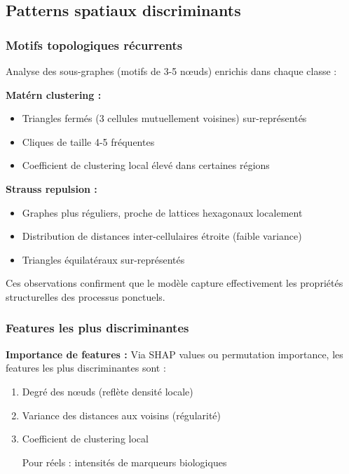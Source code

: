 \subsection{Patterns spatiaux discriminants}

\subsubsection{Motifs topologiques récurrents}

Analyse des sous-graphes (motifs de 3-5 nœuds) enrichis dans chaque classe :

\textbf{Matérn clustering :}
\begin{itemize}
    \item Triangles fermés (3 cellules mutuellement voisines) sur-représentés
    \item Cliques de taille 4-5 fréquentes
    \item Coefficient de clustering local élevé dans certaines régions
\end{itemize}

\textbf{Strauss repulsion :}
\begin{itemize}
    \item Graphes plus réguliers, proche de lattices hexagonaux localement
    \item Distribution de distances inter-cellulaires étroite (faible variance)
    \item Triangles équilatéraux sur-représentés
\end{itemize}

Ces observations confirment que le modèle capture effectivement les propriétés structurelles des processus ponctuels.

\subsubsection{Features les plus discriminantes}

\textbf{Importance de features :}
Via SHAP values ou permutation importance, les features les plus discriminantes sont :
\begin{enumerate}
    \item Degré des nœuds (reflète densité locale)
    \item Variance des distances aux voisins (régularité)
    \item Coefficient de clustering local
    \item [Pour réels : intensités de marqueurs biologiques]
\end{enumerate}

